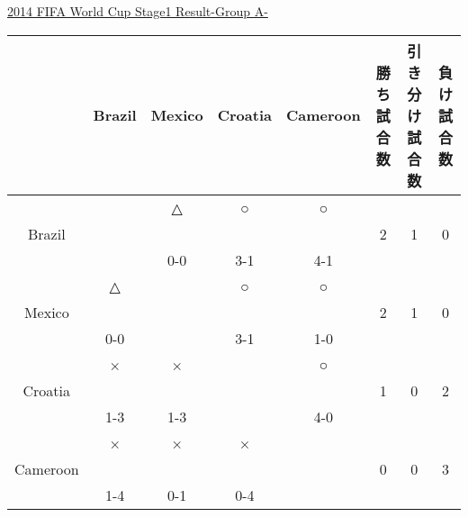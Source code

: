 \documentclass[a4j] {jarticle}
\begin{document}
		\begin{table}[htb]
		\begin{center}
		\underline{2014 FIFA World Cup Stage1 Result-Group A-}
		\begin{tabular}{|c|c|c|c|c|c|c|c|}
		\hline
		\multicolumn{1}{|c|}{} &
		\multicolumn{1}{c|}{Brazil} &
		\multicolumn{1}{c|}{Mexico} &
		\multicolumn{1}{c|}{Croatia} &
		\multicolumn{1}{c|}{Cameroon} &
		\multicolumn{1}{c|}{勝ち試合数} &
		\multicolumn{1}{c|}{引き分け試合数} &
		\multicolumn{1}{c|}{負け試合数} \\
		\hline
 &  & △ & ○ & ○ & & & \\ 
Brazil & & & & & 2 & 1 & 0 \\ 
 & & 0-0 & 3-1 & 4-1 &  & & \\ 
 \hline
 & △ &  & ○ & ○ & & & \\ 
Mexico & & & & & 2 & 1 & 0 \\ 
 &0-0 &  & 3-1 & 1-0 &  & & \\ 
 \hline
 & × & × &  & ○ & & & \\ 
Croatia & & & & & 1 & 0 & 2 \\ 
 &1-3 & 1-3 &  & 4-0 &  & & \\ 
 \hline
 & × & × & × &  & & & \\ 
Cameroon & & & & & 0 & 0 & 3 \\ 
 &1-4 & 0-1 & 0-4 &  &  & & \\ 
 \hline
		\end{tabular}
		\end{center}
		\end{table}
\end{document}
